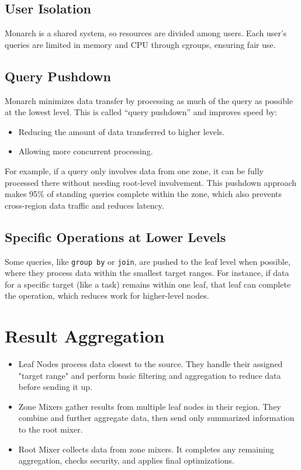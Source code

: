 \subsection{User Isolation}
Monarch is a shared system, so resources are divided among users. Each user’s queries are limited in memory and CPU through cgroups, ensuring fair use.

\subsection{Query Pushdown}
Monarch minimizes data transfer by processing as much of the query as possible at the lowest level. This is called “query pushdown” and improves speed by:
\begin{itemize}
    \item Reducing the amount of data transferred to higher levels.
    \item Allowing more concurrent processing.
\end{itemize}
For example, if a query only involves data from one zone, it can be fully processed there without needing root-level involvement. This pushdown approach makes 95\% of standing queries complete within the zone, which also prevents cross-region data traffic and reduces latency.

\subsection{Specific Operations at Lower Levels}
Some queries, like \texttt{group by} or \texttt{join}, are pushed to the leaf level when possible, where they process data within the smallest target ranges. For instance, if data for a specific target (like a task) remains within one leaf, that leaf can complete the operation, which reduces work for higher-level nodes.

\section{Result Aggregation}
\begin{itemize}
    \item Leaf Nodes process data closest to the source. They handle their assigned "target range" and perform basic filtering and aggregation to reduce data before sending it up.
    \item Zone Mixers gather results from multiple leaf nodes in their region. They combine and further aggregate data, then send only summarized information to the root mixer.
    \item Root Mixer collects data from zone mixers. It completes any remaining aggregation, checks security, and applies final optimizations.
\end{itemize}